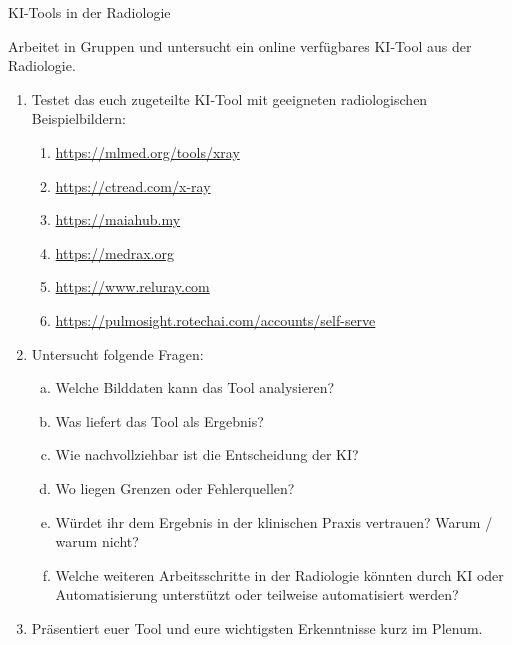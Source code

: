 \begin{frame}[plain, shrink=13]{KI-Tools in der Radiologie}
    \begin{bee}[Aufgabe]
        \scriptsize
        Arbeitet in Gruppen und untersucht ein online verfügbares
        KI-Tool aus der Radiologie.

        \begin{enumerate}[1.]
            \item Testet das euch zugeteilte KI-Tool mit geeigneten
            radiologischen Beispielbildern:
            \begin{enumerate}[A:]
                \item \url{https://mlmed.org/tools/xray}
                \item \url{https://ctread.com/x-ray}
                \item \url{https://maiahub.my}
                \item \url{https://medrax.org}
                \item \url{https://www.reluray.com}
                \item \url{https://pulmosight.rotechai.com/accounts/self-serve}
            \end{enumerate}
            \item Untersucht folgende Fragen:
            \begin{enumerate}[a)]
                \item Welche Bilddaten kann das Tool analysieren?
                \item Was liefert das Tool als Ergebnis?
                \item Wie nachvollziehbar ist die Entscheidung der KI?
                \item Wo liegen Grenzen oder Fehlerquellen?
                \item Würdet ihr dem Ergebnis in der klinischen Praxis vertrauen?
                      Warum / warum nicht?
                \item Welche weiteren Arbeitsschritte in der Radiologie könnten durch KI oder Automatisierung unterstützt oder teilweise automatisiert werden?
            \end{enumerate}
            \item Präsentiert euer Tool und eure wichtigsten Erkenntnisse
            kurz im Plenum.
        \end{enumerate}
    \end{bee}
\end{frame}

